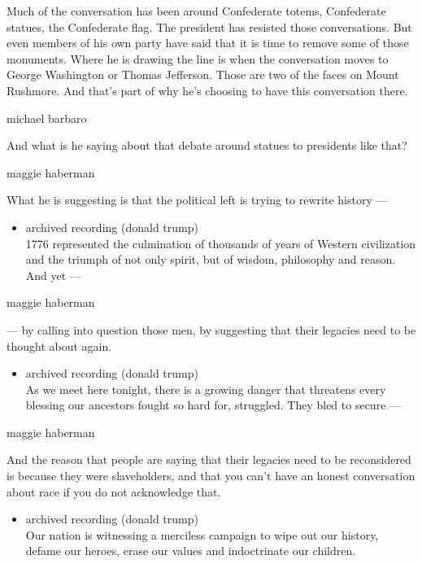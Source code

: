 Much of the conversation has been around Confederate totems, Confederate
statues, the Confederate flag. The president has resisted those
conversations. But even members of his own party have said that it is
time to remove some of those monuments. Where he is drawing the line is
when the conversation moves to George Washington or Thomas Jefferson.
Those are two of the faces on Mount Rushmore. And that's part of why
he's choosing to have this conversation there.

michael barbaro

And what is he saying about that debate around statues to presidents
like that?

maggie haberman

What he is suggesting is that the political left is trying to rewrite
history ---

\begin{itemize}
\tightlist
\item
  archived recording (donald trump)\\
  1776 represented the culmination of thousands of years of Western
  civilization and the triumph of not only spirit, but of wisdom,
  philosophy and reason. And yet ---
\end{itemize}

maggie haberman

--- by calling into question those men, by suggesting that their
legacies need to be thought about again.

\begin{itemize}
\tightlist
\item
  archived recording (donald trump)\\
  As we meet here tonight, there is a growing danger that threatens
  every blessing our ancestors fought so hard for, struggled. They bled
  to secure ---
\end{itemize}

maggie haberman

And the reason that people are saying that their legacies need to be
reconsidered is because they were slaveholders, and that you can't have
an honest conversation about race if you do not acknowledge that.

\begin{itemize}
\tightlist
\item
  archived recording (donald trump)\\
  Our nation is witnessing a merciless campaign to wipe out our history,
  defame our heroes, erase our values and indoctrinate our children.
\end{itemize}


